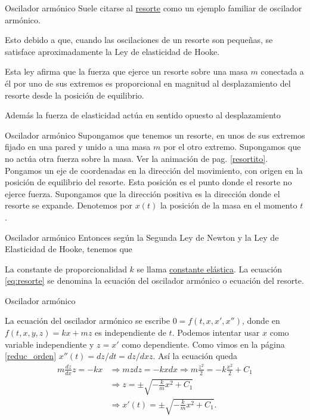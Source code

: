 \documentclass[handout,hyperref={colorlinks=true}]{beamer}
\begin{document}
\begin{frame}{Oscilador armónico}
Suele citarse al \href{http://es.wikipedia.org/wiki/Resorte}{resorte} como un ejemplo familiar de oscilador armónico.

Esto debido a que, cuando las oscilaciones de un resorte son
pequeñas,  se satisface aproximadamente la Ley de elasticidad de  Hooke.

Esta ley  afirma que la fuerza que ejerce un resorte sobre una masa $m$ conectada a él por uno 
de sus extremos es proporcional en magnitud al desplazamiento
del resorte desde la posición de equilibrio.

Además la fuerza de elasticidad actúa en sentido opuesto al desplazamiento
 
\end{frame}


\begin{frame}{Oscilador armónico}
 Supongamos que tenemos un resorte, en unos de sus extremos fijado en una pared y unido a una masa $m$ por el otro extremo. Supongamos que no actúa otra fuerza 
 sobre la masa. Ver la animación de pag. \ref{resortito}.  Pongamos un eje de coordenadas en la dirección del movimiento, con origen en la posición de equilibrio 
 del resorte. Esta posición es el punto donde el resorte no ejerce fuerza. Supongamos que la dirección positiva es la dirección donde el resorte se expande. Denotemos 
 por $x(t)$ la posición de la masa en el momento $t$.  

\end{frame}
\begin{frame}{Oscilador armónico}
  Entonces según la Segunda Ley de Newton y la Ley de Elasticidad de Hooke, tenemos que
 
 
La constante de proporcionalidad $k$ se llama \href{http://es.wikipedia.org/wiki/Rigidez}{constante elástica}. La ecuación \eqref{eq:resorte} se denomina la
ecuación del oscilador armónico o ecuación del resorte.

\end{frame}

\begin{frame}{Oscilador armónico}

La ecuación del oscilador armónico se escribe $0=f(t,x,x',x'')$, donde en $f(t,x,y,z)=kx+mz$ es independiente de $t$. Podemos intentar usar $x$ como variable 
independiente y $z=x'$ como dependiente. Como vimos en la página \ref{reduc_orden} $x''(t)=dz/dt=dz/dx z$. Así la ecuación queda
\[\begin{split}
   m\frac{dz}{dx}z=-kx &\Longrightarrow mzdz=-kxdx\Longrightarrow m\frac{z^2}{2}=-k\frac{x^2}{2}+C_1\\
   &\Longrightarrow z=\pm\sqrt{-\frac{k}{m}x^2+C_1}\\
   &\Longrightarrow x'(t)=\pm\sqrt{-\frac{k}{m}x^2+C_1}.\\
  \end{split}
\]


\end{frame}
\end{document}
